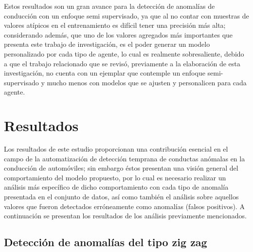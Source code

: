 Estos resultados son un gran avance para la detecci\'{o}n de anomal\'{i}as de conducci\'{o}n con un enfoque semi supervisado, ya que al no contar con muestras de valores at\'{i}picos en el entrenamiento es dif\'{i}cil tener una precisi\'{o}n m\'{a}s alta; considerando adem\'{a}s, que uno de los valores agregados m\'{a}s importantes que presenta este trabajo de investigaci\'{o}n, es el poder generar un modelo personalizado por cada tipo de agente, lo cual es realmente sobresaliente, debido a que el trabajo relacionado que se revis\'{o}, previamente a la elaboraci\'{o}n de esta investigaci\'{o}n, no cuenta con un ejemplar que contemple un enfoque semi-supervisado y mucho menos con modelos que se ajusten y personalicen para cada agente.


\section{Resultados}

Los resultados de este estudio proporcionan una contribuci\'{o}n esencial en el campo de la automatizaci\'{o}n de  detecci\'{o}n temprana de conductas an\'{o}malas en la conducci\'{o}n de autom\'{o}viles; sin embargo \'{e}stos presentan una visi\'{o}n general del comportamiento del modelo propuesto, por lo cual es necesario realizar un an\'{a}lisis m\'{a}s espec\'{i}fico de dicho comportamiento con cada tipo de anomal\'{i}a presentada en el conjunto de datos, as\'{i} como tambi\'{e}n el an\'{a}lisis sobre aquellos valores que fueron detectados err\'{o}neamente como anomal\'{i}as (falsos positivos). A continuaci\'{o}n se presentan los resultados de los an\'{a}lisis previamente mencionados.


\subsection{Detecci\'{o}n de anomal\'{i}as del tipo zig zag}

